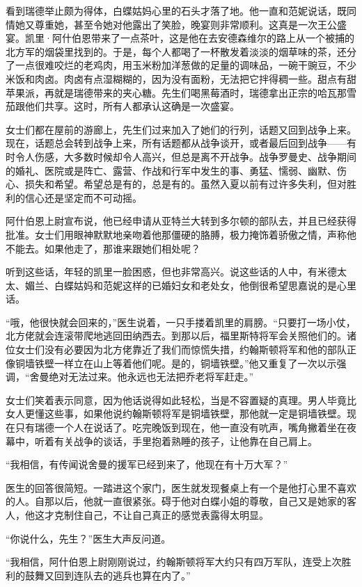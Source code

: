 \par 看到瑞德举止颇为得体，白蝶姑妈心里的石头才落了地。他一直和范妮说话，既同情她又尊重她，甚至令她对他露出了笑脸，晚宴则非常顺利。这真是一次王公盛宴。凯里·阿什伯恩带来了一点茶叶，这是他在去安德森维尔的路上从一个被捕的北方军的烟袋里找到的。于是，每个人都喝了一杯散发着淡淡的烟草味的茶，还分了一点很难咬烂的老鸡肉，用玉米粉加洋葱做的足量的调味品，一碗干豌豆，不少米饭和肉卤。肉卤有点湿糊糊的，因为没有面粉，无法把它拌得稠一些。甜点有甜苹果派，再就是瑞德带来的夹心糖。先生们喝黑莓酒时，瑞德拿出正宗的哈瓦那雪茄跟他们共享。这时，所有人都承认这确是一次盛宴。
\par 女士们都在屋前的游廊上，先生们过来加入了她们的行列，话题又回到战争上来。现在，话题总会转到战争上来，所有话题都从战争谈开，或者最后回到战争——有时令人伤感，大多数时候却令人高兴，但总是离不开战争。战争罗曼史、战争期间的婚礼、医院或是阵亡、露营、作战和行军中发生的事、勇猛、懦弱、幽默、伤心、损失和希望。希望总是有的，总是有的。虽然入夏以前有过许多失利，但对胜利的信心还是坚定而不可动摇。
\par 阿什伯恩上尉宣布说，他已经申请从亚特兰大转到多尔顿的部队去，并且已经获得批准。女士们用眼神默默地亲吻着他那僵硬的胳膊，极力掩饰着骄傲之情，声称他不能去。如果他走了，那谁来跟她们相处呢？
\par 听到这些话，年轻的凯里一脸困惑，但也非常高兴。说这些话的人中，有米德太太、媚兰、白蝶姑妈和范妮这样的已婚妇女和老处女，他倒很希望思嘉说的是心里话。
\par “哦，他很快就会回来的，”医生说着，一只手搂着凯里的肩膀。“只要打一场小仗，北方佬就会连滚带爬地逃回田纳西去。到那以后，福里斯特将军会关照他们的。诸位女士们没有必要因为北方佬靠近了我们而惊慌失措，约翰斯顿将军和他的部队正像铜墙铁壁一样立在山上等着他们呢。是的，铜墙铁壁。”他又重复了一次以示强调，“舍曼绝对无法过来。他永远也无法把乔老将军赶走。”
\par 女士们笑着表示同意，因为他话说得如此轻松，当是不容置疑的真理。男人毕竟比女人更懂这些事，如果他说约翰斯顿将军是铜墙铁壁，那他就一定是铜墙铁壁。现在只有瑞德一个人在说话了。吃完晚饭到现在，他一直没有吭声，嘴角撇着坐在夜幕中，听着有关战争的谈话，手里抱着熟睡的孩子，让他靠在自己肩上。
\par “我相信，有传闻说舍曼的援军已经到来了，他现在有十万大军？”
\par 医生的回答很简短。一踏进这个家门，医生就发现餐桌上有一个是他打心里不喜欢的人。自那以后，他就一直很紧张。碍于他对白蝶小姐的尊敬，自己又是她家的客人，他这才克制住自己，不让自己真正的感觉表露得太明显。
\par “你说什么，先生？”医生大声反问道。
\par “我相信，阿什伯恩上尉刚刚说过，约翰斯顿将军大约只有四万军队，连受上次胜利的鼓舞又回到连队去的逃兵也算在内了。”
